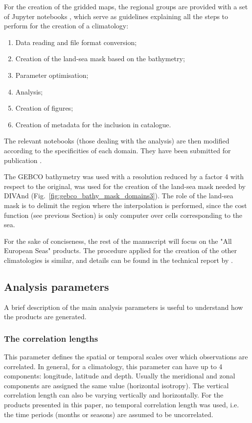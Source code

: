 \documentclass[essd, manuscript]{copernicus}
\begin{document}
For the creation of the gridded maps, the regional groups are provided with a set of Jupyter notebooks \citep[https://jupyter.org][]{KLUYVER2016}, which serve as guidelines explaining all the steps to perform for the creation of a climatology:
\begin{enumerate}
\item Data reading and file format conversion;
\item Creation of the land-sea mask based on the bathymetry;
\item Parameter optimisation;
\item Analysis;
\item Creation of figures;
\item Creation of metadata for the inclusion in catalogue.
\end{enumerate}
The relevant notebooks (those dealing with the analysis) are then modified according to the specificities of each domain. They have been submitted for publication \citep{TROUPIN2025}.

The GEBCO bathymetry \citep[2021 grid,][]{GEBCO2021} was used with a resolution reduced by a factor 4 with respect to the original, was used for the creation of the land-sea mask
needed by DIVAnd (Fig.~\ref{fig:gebco_bathy_mask_domains3}). The role of the land-sea mask is to delimit the region where the interpolation is performed, since the cost function (see previous Section) is only computer over cells corresponding to the sea. 

For the sake of conciseness, the rest of the manuscript will focus on the "All European Seas" products. The procedure applied for the creation of the other climatologies is similar, and details can be found in the technical report by \citep{BUGA2021}.

\subsection{Analysis parameters}

A brief description of the main analysis parameters is useful to understand how the products are generated.

\subsubsection{The correlation lengths}

This parameter defines the spatial or temporal scales  over which observations are correlated. In general, for a climatology, this parameter can have up to 4 components: longitude, latitude and depth. Usually the meridional and zonal components are assigned the same value (horizontal isotropy). The vertical correlation length can also be varying vertically and horizontally. For the products presented in this paper, no temporal correlation length was used, i.e. the time periods (months or seasons) are assumed to be uncorrelated. 
\end{document}
